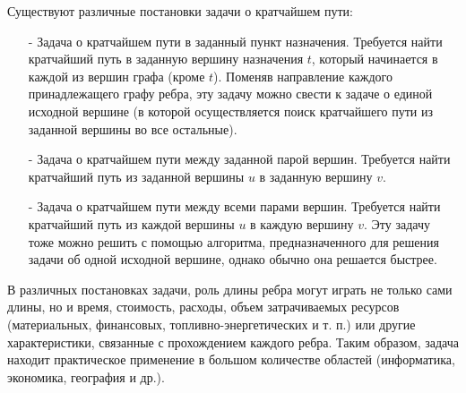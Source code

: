Существуют различные постановки задачи о кратчайшем пути:
\begin{itemize}
\item [-] Задача о кратчайшем пути в заданный пункт назначения. 
Требуется найти кратчайший путь в заданную вершину назначения $t$, который начинается в каждой из вершин графа (кроме $t$). 
Поменяв направление каждого принадлежащего графу ребра, эту задачу можно свести к задаче о единой исходной вершине (в которой осуществляется поиск кратчайшего пути из заданной вершины во все остальные).
\item [-] Задача о кратчайшем пути между заданной парой вершин. 
Требуется найти кратчайший путь из заданной вершины $u$ в заданную вершину $v$.
\item [-] Задача о кратчайшем пути между всеми парами вершин. 
Требуется найти кратчайший путь из каждой вершины $u$ в каждую вершину $v$. 
Эту задачу тоже можно решить с помощью алгоритма, предназначенного для решения задачи об одной исходной вершине, однако обычно она решается быстрее.
\end{itemize}

В различных постановках задачи, роль длины ребра могут играть не только сами длины, но и время, стоимость, расходы, объем затрачиваемых ресурсов (материальных, финансовых, топливно-энергетических и т. п.) или другие характеристики, связанные с прохождением каждого ребра. 
Таким образом, задача находит практическое применение в большом количестве областей (информатика, экономика, география и др.).

